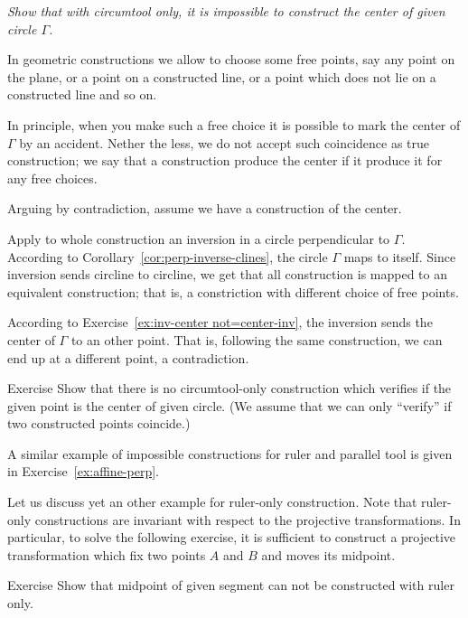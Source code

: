 \textit{Show that with circumtool only,
it is impossible to construct the center of given circle $\Gamma$.}
\medskip

In geometric constructions we allow to choose some free points,
say any point on the plane, or a point on a constructed line, or a point which does not lie on a constructed line and so on.

In principle, when you make such a free choice it is possible to mark the center of $\Gamma$ by an accident.
Nether the less, we do not accept such coincidence as true construction; 
we say that a construction produce the center if it produce it for any free choices.


\label{page:solution-for-ex:circumtool}
Arguing by contradiction, 
assume we have a construction of the center. 

Apply to whole construction an inversion in a circle perpendicular to  $\Gamma$.
According to Corollary~\ref{cor:perp-inverse-clines},
the circle
$\Gamma$ maps to itself.
Since inversion sends circline to circline, we get that all construction is mapped to an equivalent construction; 
that is, a constriction with different choice of free points.

According to Exercise~\ref{ex:inv-center not=center-inv}, 
the inversion sends the center of $\Gamma$ to an other point.
That is, following the same construction, we can end up at a different point, a contradiction.
\qeds

\begin{thm}{Exercise}\label{ex:center-verify}
Show that there is no circumtool-only construction which verifies if the given point is the center of given circle.
(We assume that we can only ``verify'' if two constructed points coincide.) 
\end{thm}

A similar example of impossible constructions for ruler and parallel tool
 is given in Exercise~\ref{ex:affine-perp}.
 
Let us discuss yet an other example for ruler-only construction.
Note that ruler-only constructions are invariant with respect to the projective transformations. 
In particular, to solve the following exercise, it is sufficient to construct a projective transformation which fix two points $A$ and $B$ and moves its midpoint.

\begin{thm}{Exercise}\label{ex:midpoint-proj}
Show that  midpoint of given segment can not be constructed with ruler only.
\end{thm}

